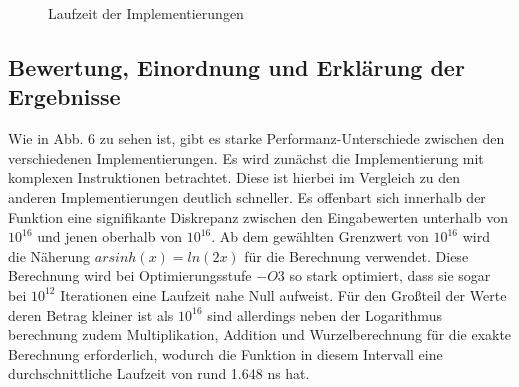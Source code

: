 \documentclass[course=erap] {aspdoc}
\begin{document}
    \begin{figure}
        \caption{Laufzeit der Implementierungen}
    \end{figure}

    \subsection{Bewertung, Einordnung und Erklärung der Ergebnisse}\label{subsec:bewertung-einordnung-und-erklarung-der-ergebnisse}

    Wie in Abb. 6 zu sehen ist, gibt es starke Performanz-Unterschiede zwischen den verschiedenen Implementierungen.
    Es wird zunächst die Implementierung mit komplexen Instruktionen betrachtet.
    Diese ist hierbei im Vergleich zu den anderen Implementierungen deutlich schneller.
    Es offenbart sich innerhalb der Funktion eine signifikante Diskrepanz zwischen den Eingabewerten unterhalb von $10^{16}$ und jenen oberhalb von $10^{16}$.
    Ab dem gewählten Grenzwert von $10^{16}$ wird die Näherung $arsinh(x) = ln(2x)$ für die Berechnung verwendet.
    Diese Berechnung wird bei Optimierungsstufe $-O3$ so stark optimiert, dass sie sogar bei $10^{12}$ Iterationen eine Laufzeit nahe Null aufweist.
    Für den Großteil der Werte deren Betrag kleiner ist als $10^{16}$ sind allerdings neben der Logarithmus berechnung zudem Multiplikation, Addition und Wurzelberechnung für die exakte Berechnung erforderlich, wodurch die Funktion in diesem Intervall eine durchschnittliche Laufzeit von rund 1.648 ns hat.
\end{document}
